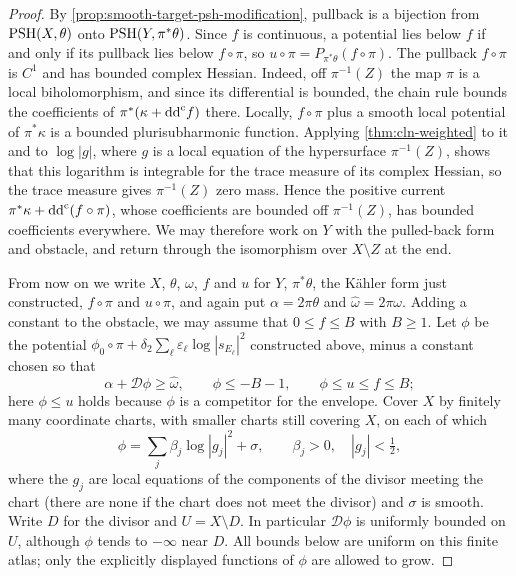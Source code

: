 \begin{proof}
By \cref{prop:smooth-target-psh-modification}, pullback is a bijection from $\mathrm{PSH}(X,\theta)$ onto $\mathrm{PSH}(Y,\pi^*\theta)$. Since $f$ is continuous, a potential lies below $f$ if and only if its pullback lies below $f\circ\pi$, so $u\circ\pi=P_{\pi^*\theta}(f\circ\pi)$. The pullback $f\circ\pi$ is $C^1$ and has bounded complex Hessian. Indeed, off $\pi^{-1}(Z)$ the map $\pi$ is a local biholomorphism, and since its differential is bounded, the chain rule bounds the coefficients of $\pi^*(\kappa+\mathrm{dd}^{\mathrm{c}} f)$ there. Locally, $f\circ\pi$ plus a smooth local potential of $\pi^*\kappa$ is a bounded plurisubharmonic function. Applying \cref{thm:cln-weighted} to it and to $\log|g|$, where $g$ is a local equation of the hypersurface $\pi^{-1}(Z)$, shows that this logarithm is integrable for the trace measure of its complex Hessian, so the trace measure gives $\pi^{-1}(Z)$ zero mass. Hence the positive current $\pi^*\kappa+\mathrm{dd}^{\mathrm{c}}(f\circ\pi)$, whose coefficients are bounded off $\pi^{-1}(Z)$, has bounded coefficients everywhere. We may therefore work on $Y$ with the pulled-back form and obstacle, and return through the isomorphism over $X\setminus Z$ at the end.

From now on we write $X$, $\theta$, $\omega$, $f$ and $u$ for $Y$, $\pi^*\theta$, the K\"ahler form just constructed, $f\circ\pi$ and $u\circ\pi$, and again put $\alpha=2\pi\theta$ and $\widehat\omega=2\pi\omega$. Adding a constant to the obstacle, we may assume that $0\leq f\leq B$ with $B\geq1$. Let $\phi$ be the potential $\phi_0\circ\pi+\delta_2\sum_\ell\varepsilon_\ell\log|s_{E_\ell}|^2$ constructed above, minus a constant chosen so that
\begin{equation}\label{eq:big-envelope-reference-bounds}
 \alpha+\mathcal D\phi\geq\widehat\omega,\qquad
 \phi\leq-B-1,\qquad \phi\leq u\leq f\leq B;
\end{equation}
here $\phi\leq u$ holds because $\phi$ is a competitor for the envelope. Cover $X$ by finitely many coordinate charts, with smaller charts still covering $X$, on each of which
\[
 \phi=\sum_j \beta_j\log|g_j|^2+\sigma,
 \qquad \beta_j>0,\quad |g_j|<\tfrac12,
\]
where the $g_j$ are local equations of the components of the divisor meeting the chart (there are none if the chart does not meet the divisor) and $\sigma$ is smooth. Write $D$ for the divisor and $U=X\setminus D$. In particular $\mathcal D\phi$ is uniformly bounded on $U$, although $\phi$ tends to $-\infty$ near $D$. All bounds below are uniform on this finite atlas; only the explicitly displayed functions of $\phi$ are allowed to grow.


\end{proof}

